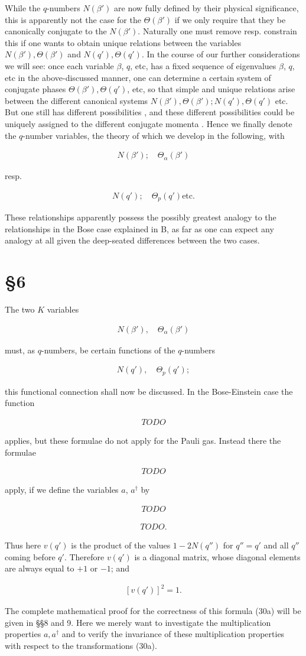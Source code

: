 \documentclass{article}
\newcommand{\nequ}[2]{
\begin{align*}
#1
\tag{#2}
\end{align*}
}
\newcommand{\uequ}[1]{
\begin{align*}
#1
\end{align*}
}
\begin{document}
While the $q$-numbers $N(\beta')$ are now fully defined by their physical significance, this is apparently not the case for the $\Theta(\beta')$ if we only require that they be canonically conjugate to the $N(\beta')$. Naturally one must remove resp. constrain this  if one wants to obtain unique relations between the variables $N(\beta'),\Theta(\beta')$ and $N(q'), \Theta(q')$. In the course of our further considerations we will see: once each variable $\beta$, $q$, etc, has a fixed sequence of eigenvalues $\beta$, $q$, etc in the above-discussed manner, one can determine a certain system of conjugate phases $\Theta(\beta'),\Theta(q')$, etc, so that simple and unique relations arise between the different canonical systems $N(\beta'),\Theta(\beta'); N(q'),\Theta(q')$ etc. But one still has different possibilities , and these different possibilities could be uniquely assigned to the different conjugate momenta . Hence we finally denote the $q$-number variables, the theory of which we develop in the following, with
\nequ{
N(\beta'); \quad \Theta_\alpha(\beta')
}{28}
resp.
\nequ{
N(q'); \quad \Theta_p(q') \text{etc}.
}{29}

These relationships apparently possess the possibly greatest analogy to the relationships in the Bose case explained in B, as far as one can expect any analogy at all given the deep-seated differences between the two cases.

\section*{§6}
The two $K$ variables
\uequ{
N(\beta'), \quad \Theta_\alpha(\beta')
}
must, as $q$-numbers, be certain functions of the $q$-numbers
\uequ{
N(q'),\quad \Theta_p(q');
}
this functional connection shall now be discussed. In the Bose-Einstein case the function
\nequ{
TODO
}{30}
applies, but these formulae do not apply for the Pauli gas. Instead there the formulae
\nequ{
TODO
}{30a}
apply, if we define the variables $a$, $a^\dagger$ by
\nequ{TODO}{31}
\nequ{TODO.}{32}
Thus here $v(q')$ is the product of the values $1-2N(q'')$ for $q''=q'$ and all $q''$ coming before $q'$. Therefore $v(q')$ is a diagonal matrix, whose diagonal elements are always equal to $+1$ or $-1$; and
\nequ{
[v(q')]^2 = 1.
}{33}

The complete mathematical proof for the correctness of this formula (30a) will be given in §§8 and 9. Here we merely want to investigate the multiplication properties $a,a^\dagger$ and to verify the invariance of these multiplication properties with respect to the transformations (30a).
\end{document}
